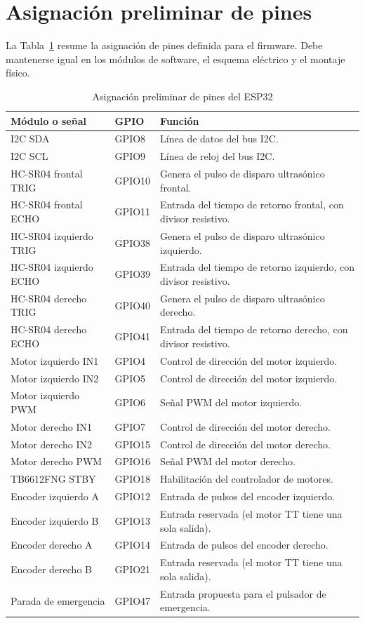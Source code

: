 \documentclass[journal]{IEEEtran}
\begin{document}
\section{Asignación preliminar de pines}

La Tabla~\ref{tab:pinout} resume la asignación de pines definida para el firmware. Debe mantenerse igual en los módulos de software, el esquema eléctrico y el montaje físico.

\begin{table}[t]
\centering
\caption{Asignación preliminar de pines del ESP32}
\label{tab:pinout}
\scriptsize
\begin{tabular}{p{} p{} p{}}
\toprule
\textbf{Módulo o señal} & \textbf{GPIO} & \textbf{Función} \\
\midrule
I2C SDA & GPIO8 & Línea de datos del bus I2C. \\
I2C SCL & GPIO9 & Línea de reloj del bus I2C. \\
HC-SR04 frontal TRIG & GPIO10 & Genera el pulso de disparo ultrasónico frontal. \\
HC-SR04 frontal ECHO & GPIO11 & Entrada del tiempo de retorno frontal, con divisor resistivo. \\
HC-SR04 izquierdo TRIG & GPIO38 & Genera el pulso de disparo ultrasónico izquierdo. \\
HC-SR04 izquierdo ECHO & GPIO39 & Entrada del tiempo de retorno izquierdo, con divisor resistivo. \\
HC-SR04 derecho TRIG & GPIO40 & Genera el pulso de disparo ultrasónico derecho. \\
HC-SR04 derecho ECHO & GPIO41 & Entrada del tiempo de retorno derecho, con divisor resistivo. \\
Motor izquierdo IN1 & GPIO4 & Control de dirección del motor izquierdo. \\
Motor izquierdo IN2 & GPIO5 & Control de dirección del motor izquierdo. \\
Motor izquierdo PWM & GPIO6 & Señal PWM del motor izquierdo. \\
Motor derecho IN1 & GPIO7 & Control de dirección del motor derecho. \\
Motor derecho IN2 & GPIO15 & Control de dirección del motor derecho. \\
Motor derecho PWM & GPIO16 & Señal PWM del motor derecho. \\
TB6612FNG STBY & GPIO18 & Habilitación del controlador de motores. \\
Encoder izquierdo A & GPIO12 & Entrada de pulsos del encoder izquierdo. \\
Encoder izquierdo B & GPIO13 & Entrada reservada (el motor TT tiene una sola salida). \\
Encoder derecho A & GPIO14 & Entrada de pulsos del encoder derecho. \\
Encoder derecho B & GPIO21 & Entrada reservada (el motor TT tiene una sola salida). \\
Parada de emergencia & GPIO47 & Entrada propuesta para el pulsador de emergencia. \\
\bottomrule
\end{tabular}
\end{table}
\end{document}
